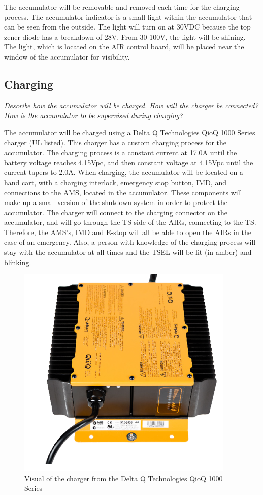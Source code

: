 \documentclass{article}
\begin{document}
    The accumulator will be removable and removed each time for the charging process. The accumulator indicator is a small light within the accumulator that can be seen from the outside. The light will turn on at 30VDC because the top zener diode has a breakdown of 28V. From 30-100V, the light will be shining. The light, which is located on the AIR control board, will be placed near the window of the accumulator for visibility.

\subsection{Charging}

\textit{Describe how the accumulator will be charged. How will the charger be connected? How is the accumulator to be supervised during charging?}

The accumulator will be charged using a Delta Q Technologies QioQ 1000 Series charger (UL listed). This charger has a custom charging process for the accumulator. The charging process is a constant current at 17.0A until the battery voltage reaches 4.15Vpc, and then constant voltage at 4.15Vpc until the current tapers to 2.0A. When charging, the accumulator will be located on a hand cart, with a charging interlock, emergency stop button, IMD, and connections to the AMS, located in the accumulator. These components will make up a small version of the shutdown system in order to protect the accumulator. The charger will connect to the charging connector on the accumulator, and will go through the TS side of the AIRs, connecting to the TS. Therefore, the AMS's, IMD and E-stop will all be able to open the AIRs in the case of an emergency. Also, a person with knowledge of the charging process will stay with the accumulator at all times and the TSEL will be lit (in amber) and blinking.

\begin{figure}[H]
    \centering
    \includegraphics[width = 0.7 \textwidth]{chargepic}
    \caption{Visual of the charger from the Delta Q Technologies QioQ 1000 Series}
    \label{chargepic}
\end{figure}
\end{document}
